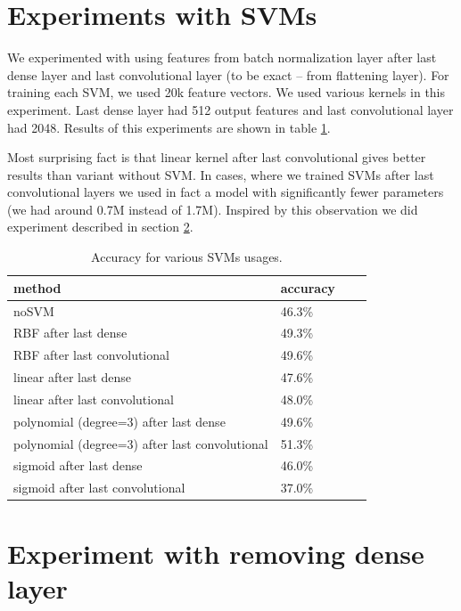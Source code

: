 \documentclass[a4paper]{article}
\begin{document}
\section{Experiments with SVMs}
\label{svm}

We experimented with using features from batch normalization layer after last dense layer and last convolutional layer (to be exact -- from flattening layer).
For training each SVM, we used 20k feature vectors.
We used various kernels in this experiment.
Last dense layer had 512 output features and last convolutional layer had 2048.
Results of this experiments are shown in table \ref{table:svm}.

Most surprising fact is that linear kernel after last convolutional gives
better results than variant without SVM.
In cases, where we trained SVMs after last convolutional layers we
used in fact a model with significantly fewer parameters (we had around 0.7M instead of 1.7M).
Inspired by this observation we did experiment described in section \ref{last}.

\begin{table}[!h]
    \caption{Accuracy for various SVMs usages.
    \label{table:svm}
    }
\begin{center}
    \begin{tabular}{| l | l | l | l |}
    \hline
    method&accuracy \\
    \hline
        noSVM & 46.3\% \\
        RBF after last dense & 49.3\% \\
        RBF after last convolutional & 49.6\% \\
        linear after last dense & 47.6\% \\
        linear after last convolutional & 48.0\% \\
        polynomial (degree=3) after last dense & 49.6\% \\
        polynomial (degree=3) after last convolutional & 51.3\% \\
        sigmoid after last dense & 46.0\% \\
        sigmoid after last convolutional & 37.0\% \\
    \hline
    \end{tabular}
\end{center}
\end{table}

\section{Experiment with removing dense layer}
\label{last}
\end{document}

